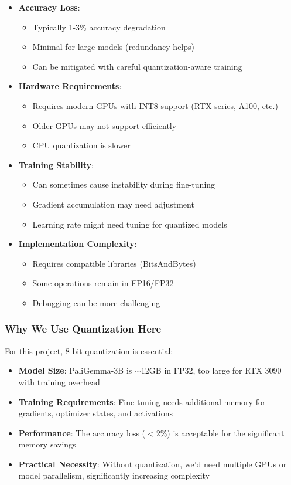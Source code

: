 \documentclass[conference]{IEEEtran}
\begin{document}
\begin{itemize}
    \item \textbf{Accuracy Loss}: 
    \begin{itemize}
        \item Typically 1-3\% accuracy degradation
        \item Minimal for large models (redundancy helps)
        \item Can be mitigated with careful quantization-aware training
    \end{itemize}
    
    \item \textbf{Hardware Requirements}:
    \begin{itemize}
        \item Requires modern GPUs with INT8 support (RTX series, A100, etc.)
        \item Older GPUs may not support efficiently
        \item CPU quantization is slower
    \end{itemize}
    
    \item \textbf{Training Stability}:
    \begin{itemize}
        \item Can sometimes cause instability during fine-tuning
        \item Gradient accumulation may need adjustment
        \item Learning rate might need tuning for quantized models
    \end{itemize}
    
    \item \textbf{Implementation Complexity}:
    \begin{itemize}
        \item Requires compatible libraries (BitsAndBytes)
        \item Some operations remain in FP16/FP32
        \item Debugging can be more challenging
    \end{itemize}
\end{itemize}

\subsubsection{Why We Use Quantization Here}

For this project, 8-bit quantization is essential:

\begin{itemize}
    \item \textbf{Model Size}: PaliGemma-3B is $\sim$12GB in FP32, too large for RTX 3090 with training overhead
    \item \textbf{Training Requirements}: Fine-tuning needs additional memory for gradients, optimizer states, and activations
    \item \textbf{Performance}: The accuracy loss ($<$2\%) is acceptable for the significant memory savings
    \item \textbf{Practical Necessity}: Without quantization, we'd need multiple GPUs or model parallelism, significantly increasing complexity
\end{itemize}
\end{document}
